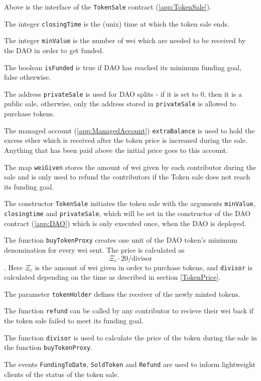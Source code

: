 \documentclass[9pt,oneside]{amsart}
\begin{document}
\begin{multicols}{2}
Above is the interface of the \verb|TokenSale| contract (\ref{app:TokenSale}). 

The integer \verb|closingTime| is the (unix) time at which the token sale ends.

The integer \verb|minValue| is the number of wei which are needed to be received by the DAO in order to get funded.

The boolean \verb|isFunded| is true if DAO has reached its minimum funding goal, false otherwise.

The address \verb|privateSale| is used for DAO splits - if it is set to 0, then it is a public sale, otherwise, only the address stored in \verb|privateSale| is allowed to purchase tokens.

The managed account (\ref{app:ManagedAccount}) \verb|extraBalance| is used to hold the excess ether which is received after the token price is increased during the sale. Anything that has been paid above the initial price goes to this account.

The map \verb|weiGiven| stores the amount of wei given by each contributor during the sale and is only used to refund the contributors if the Token sale does not reach its funding goal.

The constructor \verb|TokenSale| initiates the token sale with the arguments \verb|minValue|, \verb|closingtime| and \verb|privateSale|, which will be set in the constructor of the DAO contract (\ref{app:DAO}) which is only executed once, when the DAO is deployed. 

The function \verb|buyTokenProxy| creates one unit of the DAO token’s minimum denomination for every wei sent. The price is calculated as $$\Xi_c \cdot 20 / \text{divisor}$$. Here $\Xi_c$ is the amount of wei given in order to purchase tokens, and \verb|divisor| is calculated depending on the time as described in section \ref{TokenPrice}.

The parameter \verb|tokenHolder| defines the receiver of the newly minted tokens. 

The function \verb|refund| can be called by any contributor to recieve their wei back if the token sale failed to meet its funding goal.

The function \verb|divisor| is used to calculate the price of the token during the sale in the function \verb|buyTokenProxy|.

The events \verb|FundingToDate|, \verb|SoldToken| and \verb|Refund| are used to inform lightweight clients of the status of the token sale.
\end{multicols}
\end{document}
